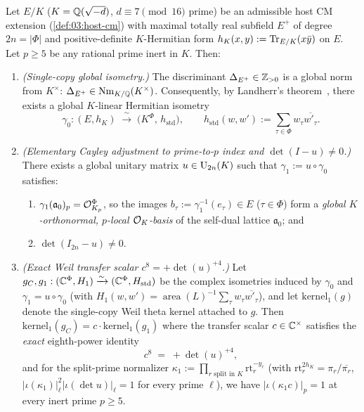 \begin{theorem}[Single-copy ($k=1$) global Hermitian isometry and exact Weil transfer scalar]
\label{thm:07:landherr-single-copy}
Let $E/K$ ($K = \mathbb{Q}(\sqrt{-d})$, $d \equiv 7 \pmod{16}$ prime) be an admissible host CM extension (\cref{def:03:host-cm}) with maximal totally real subfield $E^+$ of degree $2n = |\Phi|$ and positive-definite $K$-Hermitian form $h_K(x, y) := \operatorname{Tr}_{E/K}(x \bar{y})$ on $E$. Let $p \ge 5$ be any rational prime inert in $K$. Then:
\begin{enumerate}[label=\textup{(\roman*)}]
\item \emph{(Single-copy global isometry.)} The discriminant $\Delta_{E^+} \in \mathbb{Z}_{>0}$ is a global norm from $K^\times$: $\Delta_{E^+} \in \operatorname{Nm}_{K/\mathbb{Q}}(K^\times)$. Consequently, by Landherr's theorem~\cite{Landherr1936}, there exists a global $K$-linear Hermitian isometry
  \[
    \gamma_0 : (E, h_K) \;\xrightarrow{\;\sim\;}\; \bigl(K^{\Phi},\, h_{\mathrm{std}}\bigr),
    \qquad h_{\mathrm{std}}(w, w') := \sum_{\tau \in \Phi} w_\tau \overline{w'_\tau}.
  \]
\item \emph{(Elementary Cayley adjustment to prime-to-$p$ index and $\det(I - u) \neq 0$.)} There exists a global unitary matrix $u \in \mathrm{U}_{2n}(K)$ such that $\gamma_1 := u \circ \gamma_0$ satisfies:
  \begin{enumerate}[label=\textup{(\alph*)}]
  \item $\gamma_1(\mathfrak{a}_0)_p = \mathcal{O}_{K_p}^{\Phi}$, so the images $b_\tau := \gamma_1^{-1}(e_\tau) \in E$ ($\tau \in \Phi$) form a \emph{global $K$-orthonormal, $p$-local $\mathcal{O}_K$-basis} of the self-dual lattice $\mathfrak{a}_0$; and
  \item $\det(I_{2n} - u) \neq 0$.
  \end{enumerate}
\item \emph{(Exact Weil transfer scalar $c^8 = +\det(u)^{+4}$.)} Let $g_C, g_1 : (\mathbb{C}^{\Phi}, H_1) \xrightarrow{\sim} (\mathbb{C}^{\Phi}, H_{\mathrm{std}})$ be the complex isometries induced by $\gamma_0$ and $\gamma_1 = u \circ \gamma_0$ (with $H_1(w, w') = \operatorname{area}(L)^{-1}\sum_\tau w_\tau \overline{w'_\tau}$), and let $\mathrm{kernel}_1(g)$ denote the single-copy Weil theta kernel attached to $g$. Then $\mathrm{kernel}_1(g_C) = c \cdot \mathrm{kernel}_1(g_1)$ where the transfer scalar $c \in \mathbb{C}^\times$ satisfies the \emph{exact} eighth-power identity
  \begin{equation}
  \label{eq:07:weil-scalar}
    c^8 \;=\; +\det(u)^{+4},
  \end{equation}
  and for the split-prime normalizer $\kappa_1 := \prod_{r \text{ split in } K} \mathrm{rt}_r^{-y_r}$ (with $\mathrm{rt}_r^{2h_K} = \pi_r / \overline{\pi_r}$, $|\iota(\kappa_1)|_\ell^2 |\iota(\det u)|_\ell = 1$ for every prime $\ell$), we have $|\iota(\kappa_1 c)|_p = 1$ at every inert prime $p \ge 5$.
\end{enumerate}
\end{theorem}

